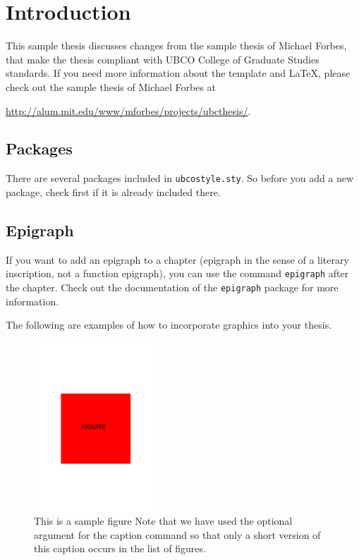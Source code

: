 \chapter{Introduction}

This sample thesis discusses changes from the
sample thesis of Michael Forbes, that make the thesis
compliant with UBCO College of Graduate Studies
standards. If you need more information about the template and LaTeX,
please check out the sample thesis of Michael Forbes at

\href{http://alum.mit.edu/www/mforbes/projects/ubcthesis/}{http://alum.mit.edu/www/mforbes/projects/ubcthesis/}.

\cite{MR2848848,MR2461448,MR2834159,infconv,convmono,MR2668638,Bauschke:2007-PA02,proxbas}

\section{Packages}

There are several packages included in
\texttt{ubcostyle.sty}. So before you add a new package, check first
if it is already included there.

\section{Epigraph}

If you want to add an epigraph to a chapter (epigraph in the sense of
a literary inscription, not a function epigraph), you can use the
command \texttt{epigraph} after the chapter. Check out the
documentation of the \texttt{epigraph} package for more information.

The following are examples of how to incorporate graphics into your thesis.

\begin{figure}[ht]
  \begin{center}
    \includegraphics[width=0.4\textwidth]{figure}
    \caption[Sample figure.]{\label{fig:happy} This is a sample figure
      Note that we have
      used the optional argument for the caption command so that only
      a short version of this caption occurs in the list of figures.}
  \end{center}
\end{figure}


